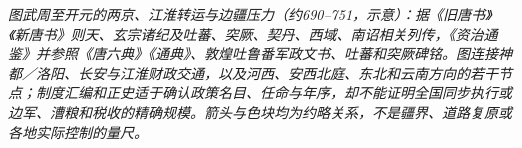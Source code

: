 \begin{center}

\smallskip
\small\textit{图\quad 武周至开元的两京、江淮转运与边疆压力（约690--751，示意）：据《旧唐书》《新唐书》则天、玄宗诸纪及吐蕃、突厥、契丹、西域、南诏相关列传，《资治通鉴》并参照《唐六典》《通典》、敦煌吐鲁番军政文书、吐蕃和突厥碑铭。图连接神都／洛阳、长安与江淮财政交通，以及河西、安西北庭、东北和云南方向的若干节点；制度汇编和正史适于确认政策名目、任命与年序，却不能证明全国同步执行或边军、漕粮和税收的精确规模。箭头与色块均为约略关系，不是疆界、道路复原或各地实际控制的量尺。}
\end{center}
